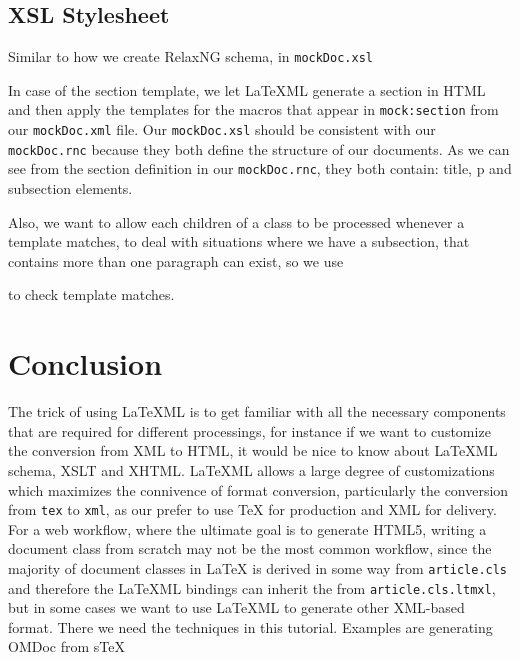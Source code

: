 \documentclass[a4paper]{article}
\def\latexml{{\LaTeX}ML\xspace}
\begin{document}
\subsection{XSL Stylesheet}
Similar to how we create RelaxNG schema, in \lstinline|mockDoc.xsl|
 

In case of the section template, we let \latexml generate a section in HTML and then apply the templates for the macros that appear in \lstinline|mock:section| from our \lstinline|mockDoc.xml| file. Our \lstinline|mockDoc.xsl| should be consistent with our \lstinline|mockDoc.rnc| because they both define the structure of our documents. As we can see from the section definition in our \lstinline|mockDoc.rnc|, they both contain: title, p and subsection elements.
 
Also, we want to allow each children of a class to be processed whenever a template matches, to deal with situations where we have a subsection, that contains more than one paragraph can exist, so we use
 
to check template matches.

\section{Conclusion}\label{sec:concl}
The trick of using \latexml is to get familiar with all the necessary components that are required for different processings, for instance if we want to customize the conversion from XML to HTML, it would be nice to know about \latexml schema, XSLT and XHTML. \latexml allows a large degree of customizations which maximizes the connivence of format conversion, particularly the conversion from \lstinline|tex| to \lstinline|xml|, as our prefer to use  {\TeX} for production and XML for delivery. For a web workflow, where the ultimate goal is to generate HTML5, writing a document class from scratch may not be the most common workflow, since the majority of document classes in {\LaTeX} is derived in some way from \lstinline|article.cls| and therefore
  the \latexml bindings can inherit the from \lstinline|article.cls.ltmxl|, but in some
  cases we want to use \latexml to generate other XML-based format. There we need the
  techniques in this tutorial. Examples are generating OMDoc from s\TeX{}


\newpage
\end{document}
